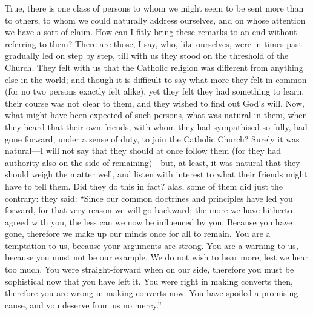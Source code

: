 True, there is one class of persons to whom we might seem to be
sent more than to others, to whom we could naturally address
ourselves, and on whose attention we have a sort of claim. How can I
fitly bring these remarks to an end without referring to them? There
are those, I say, who, like ourselves, were in times past gradually
led on step by step, till with us they stood on the threshold of the
Church. They felt with us that the Catholic religion was different
from anything else in the world; and though it is difficult to say
what more they felt in common (for no two persons exactly felt alike),
yet they felt they had something to learn, their course was not clear
to them, and they wished to find out God's will. Now, what might have
been expected of such persons, what was natural in them, when they
heard that their own friends, with whom they had sympathised so fully,
had gone forward, under a sense of duty, to join the Catholic Church?
Surely it was natural—I will not say that they should at once follow
them (for they had authority also on the side of remaining)—but, at
least, it was natural that they should weigh the matter well, and
listen with interest to what their friends might have to tell them.
Did they do this in fact? alas, some of them did just the contrary:
they said: ``Since our common doctrines and principles have led
you forward, for that very reason we will go backward; the more we
have hitherto agreed with you, the less can we now be influenced by
you. Because you have gone, therefore we make up our minds once for
all to remain. You are a temptation to us, because your arguments are
strong. You are a warning to us, because you must not be our example.
We do not wish to hear more, lest we hear too much. You were
straight-forward when on our side, therefore you must be sophistical
now that you have left it. You were right in making converts then,
therefore you are wrong in making converts now. You have spoiled a
promising cause, and you deserve from us no mercy.''

